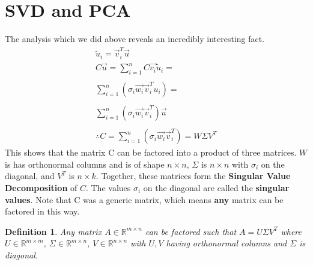 \documentclass{article}
\newtheorem{definition}{Definition}
\begin{document}
\section{SVD and PCA}
The analysis which we did above reveals an incredibly interesting fact.
\[
    \begin{array}{c}
        \tilde{u}_i=\vec{v}_i^T\vec{u}\\
        C\vec{u}=\sum_{i=1}^{n}{C\vec{v_i}\tilde{u}_i}=\\\\
        \sum_{i=1}^{n}{(\sigma_i\vec{w_i}\vec{v}^T_iu_i)}=\\\\
        \sum_{i=1}^{n}{(\sigma_i\vec{w_i}\vec{v}^T_i)} \vec{u}\\\\
        \therefore C = \sum_{i=1}^{n}{(\sigma_i\vec{w_i}\vec{v}^T_i)} = W\Sigma V^T
    \end{array}
\]
This shows that the matrix C can be factored into a product of three matrices.
$W$ is has orthonormal columns and is of shape $n\times n$, $\Sigma$ is $n\times n$ with $\sigma_i$ on the diagonal, and $V^T$ is $n \times k$.
Together, these matrices form the \textbf{Singular Value Decomposition} of $C$. The values $\sigma_i$ on the diagonal are called the \textbf{singular values}. Note that C was a generic matrix, which means \textbf{any} matrix can be factored in this way. 
\begin{definition}
    Any matrix $A\in \mathbb{R}^{m\times n}$ can be factored such that $A = U\Sigma V^T$
     where $U\in \mathbb{R}^{m\times m}$, $\Sigma \in \mathbb{R}^{m \times n}$, $V\in \mathbb{R}^{n \times n}$
     with $U,V$ having orthonormal columns and $\Sigma$ is diagonal. 
\end{definition}
\end{document}
